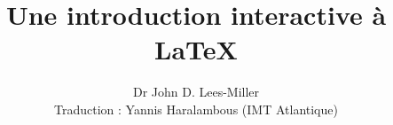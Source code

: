 \newenvironment{exampletwouptiny}
  {\VerbatimEnvironment
   \begin{VerbatimOut}{example.out}}
  {\end{VerbatimOut}
   \setlength{\parindent}{0pt}
   \fbox{\begin{tabular}{l|l}
   \begin{minipage}{0.55\linewidth}
     \inputminted[fontsize=\scriptsize,resetmargins]{latex}{example.out}
   \end{minipage} &
   \begin{minipage}{0.35\linewidth}
     \setlength{\parskip}{6pt plus 1pt minus 1pt}%
     \raggedright\scriptsize
   \end{minipage}
   \end{tabular}}}

\newenvironment{exampletwouptinynoframe}
  {\VerbatimEnvironment
   \begin{VerbatimOut}{example.out}}
  {\end{VerbatimOut}
   \setlength{\parindent}{0pt}
   \begin{tabular}{l|l}
   \begin{minipage}{0.55\linewidth}
     \inputminted[fontsize=\scriptsize,resetmargins]{latex}{example.out}
   \end{minipage} &
   \begin{minipage}{0.35\linewidth}
     \setlength{\parskip}{6pt plus 1pt minus 1pt}%
     \raggedright\scriptsize
   \end{minipage}
   \end{tabular}}

\title{Une introduction interactive à \LaTeX}
\author{Dr John D. Lees-Miller\\Traduction : Yannis Haralambous (IMT Atlantique)}
